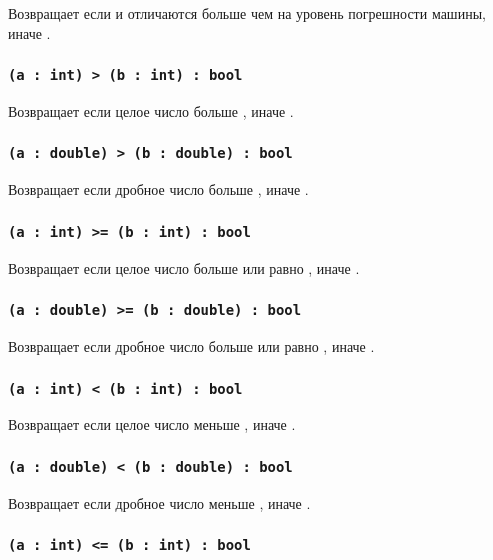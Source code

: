Возвращает \true{} если  и  отличаются больше чем на уровень погрешности машины, иначе \false{}.

\subsubsection{\lstinline`(a : int) > (b : int) : bool`}

Возвращает \true{} если целое число  больше , иначе \false{}.

\subsubsection{\lstinline`(a : double) > (b : double) : bool`}

Возвращает \true{} если дробное число  больше , иначе \false{}.

\subsubsection{\lstinline`(a : int) >= (b : int) : bool`}

Возвращает \true{} если целое число  больше или равно , иначе \false{}.

\subsubsection{\lstinline`(a : double) >= (b : double) : bool`}

Возвращает \true{} если дробное число  больше или равно , иначе \false{}.

\subsubsection{\lstinline`(a : int) < (b : int) : bool`}

Возвращает \true{} если целое число  меньше , иначе \false{}.

\subsubsection{\lstinline`(a : double) < (b : double) : bool`}

Возвращает \true{} если дробное число  меньше , иначе \false{}.

\subsubsection{\lstinline`(a : int) <= (b : int) : bool`}

